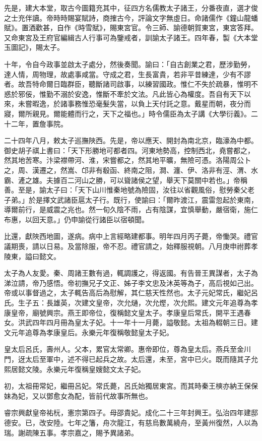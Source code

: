 先是，建大本堂，取古今圖籍充其中，征四方名儒教太子諸王，分番夜直，選才俊之士充伴讀。帝時時賜宴賦詩，商搉古今，評論文字無虛日。命諸儒作《鐘山龍蟠賦》。置酒歡甚，自作《時雪賦》，賜東宮官。令三師、諭德朝賀東宮，東宮答拜。又命東宮及王府官編緝古人行事可為鑒戒者，訓諭太子諸王。四年春，製《大本堂玉圖記》，賜太子。

十年，令自今政事並啟太子處分，然後奏聞。諭曰：「自古創業之君，歷涉勤勞，達人情，周物理，故處事咸當。守成之君，生長富貴，若非平昔練達，少有不謬者。故吾特命爾日臨群臣，聽斷諸司啟事，以練習國政。惟仁不失於疏暴，惟明不惑於邪佞，惟勤不溺於安逸，惟斷不牽於文法。凡此皆心為權度。吾自有天下以來，未嘗暇逸，於諸事務惟恐毫髮失當，以負上天付託之意。戴星而朝，夜分而寢，爾所親見。爾能體而行之，天下之福也。」時令儒臣為太子講《大學衍義》。二十二年，置詹事院。

二十四年八月，敕太子巡撫陜西。先是，帝以應天、開封為南北京，臨濠為中都。御史胡子祺上書曰：「天下形勝地可都者四。河東地勢高，控制西北，堯嘗都之，然其地苦寒。汴梁襟帶河、淮，宋嘗都之，然其地平曠，無險可憑。洛陽周公卜之，周、漢遷之，然嵩、邙非有殽函、終南之阻，澗、瀍、伊、洛非有涇、渭、水霸、滻之雄。夫據百二河山之勝，可以聳諸侯之望，舉天下莫關中若也。」帝稱善。至是，諭太子曰：「天下山川惟秦地號為險固，汝往以省觀風俗，慰勞秦父老子弟。」於是擇文武諸臣扈太子行。既行，使諭曰：「爾昨渡江，震雷忽起於東南，導爾前行，是威震之兆也。然一旬久陰不雨，占有陰謀，宜慎舉動，嚴宿衛，施仁布惠，以回天意。」仍申諭從行諸臣以宿頓聞。

比還，獻陜西地圖，遂病。病中上言經略建都事。明年四月丙子薨，帝慟哭。禮官議期喪，請以日易。及當除服，帝不忍。禮官請之，始釋服視朝。八月庚申祔葬孝陵東，謚曰懿文。

太子為人友愛。秦、周諸王數有過，輒調護之，得返國。有告晉王異謀者，太子為涕泣請，帝乃感悟。帝初撫兄子文正、姊子李文忠及沐英等為子，高后視如己出。帝或以事督過之，太子輒告高后為慰解，其仁慈天性然也。太子元妃常氏，繼妃呂氏。生子五：長雄英，次建文皇帝，次允熥，次允熞，次允熙。建文元年追尊為孝康皇帝，廟號興宗。燕王即帝位，復稱懿文皇太子。孝康皇后常氏，開平王遇春女。洪武四年四月冊為皇太子妃。十一年十一月薨，謚敬懿。太祖為輟朝三日。建文元年追尊為孝康皇后。永樂元年復稱敬懿皇太子妃。

皇太后呂氏，壽州人。父本，累官太常卿。惠帝即位，尊為皇太后。燕兵至金川門，迓太后至軍中，述不得已起兵之故。太后還，未至，宮中已火。既而隨其子允熙居懿文陵。永樂元年復稱皇嫂懿文太子妃。

初，太祖冊常妃，繼冊呂妃。常氏薨，呂氏始獨居東宮。而其時秦王樉亦納王保保妹為妃，又以鄧愈女為配，皆前代故事所無也。

睿宗興獻皇帝祐杬，憲宗第四子。母邵貴妃。成化二十三年封興王。弘治四年建邸德安。已，改安陸。七年之籓，舟次龍江，有慈烏數萬繞舟，至黃州復然，人以為瑞。謝疏陳五事。孝宗嘉之，賜予異諸弟。

